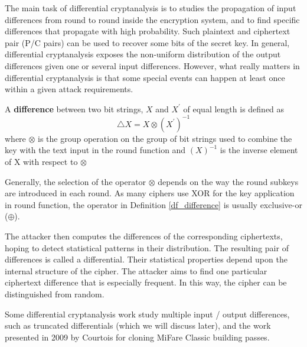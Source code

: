 The main task of differential cryptanalysis is to studies the propagation of input differences from round to round inside the encryption system, and to find specific differences that propagate with high probability. Such plaintext and ciphertext pair (P/C pairs) can be used to recover some bits of the secret key. In general, differential cryptanalysis exposes the non-uniform distribution of the output differences given one or several input differences. However, what really matters in differential cryptanalysis is that some special events can happen at least once within a given attack requirements.

\begin{mydef} \label{df_difference}
	A \textbf{difference} between two bit strings, $X$ and $X^{'}$ of equal length is defined as $$\triangle X = X \otimes (X^{'})^{-1}$$
	where $\otimes$ is the group operation on the group of bit strings used to combine the key with the text input in the round function and $(X)^{-1}$ is the inverse element of X with respect to $\otimes$
\end{mydef}

Generally, the selection of the operator $\otimes$ depends on the way the round subkeys are introduced in each round. As many ciphers use XOR for the key application in round function, the operator in Definition \ref{df_difference} is usually exclusive-or ($\oplus$).

The attacker then computes the differences of the corresponding ciphertexts, hoping to detect statistical patterns in their distribution. The resulting pair of differences is called a differential. Their statistical properties depend upon the internal structure of the cipher. The attacker aims to find one particular ciphertext difference that is especially frequent. In this way, the cipher can be distinguished from random.

Some differential cryptanalysis work study multiple input / output differences, such as truncated differentials (which we will discuss later), and the work presented in 2009 by Courtois \cite{secrypt09} for cloning MiFare Classic building passes.

